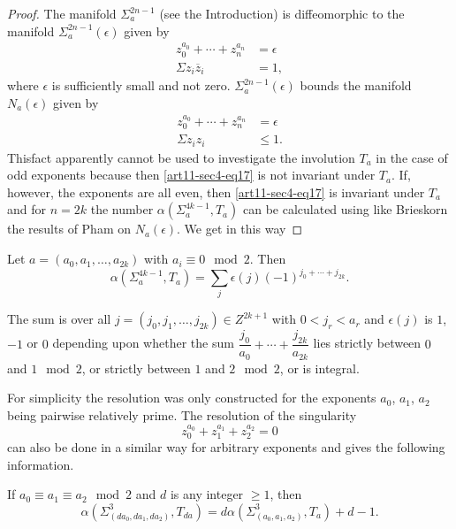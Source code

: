 \begin{proof}
The manifold $\Sigma^{2n-1}_{a}$ (see the Introduction) is diffeomorphic to the manifold $\Sigma^{2n-1}_{a}(\epsilon)$ given by
\begin{align*}
z^{a_{0}}_{0}+\cdots+z^{a_{n}}_{n} &=\epsilon\tag{16}\label{art11-sec4-eq16}\\
\Sigma z_{i}\overline{z}_{i} &= 1,
\end{align*}
where $\epsilon$ is sufficiently small and not zero. $\Sigma^{2n-1}_{a}(\epsilon)$ bounds the manifold $N_{a}(\epsilon)$ given by
\begin{align*}
z^{a_{0}}_{0}+\cdots+ z^{a_{n}}_{n} &=\epsilon\tag{17}\label{art11-sec4-eq17}\\
\Sigma z_{i}z_{i} &\leq 1.
\end{align*}
This\pageoriginale fact apparently cannot be used to investigate the involution $T_{a}$ in the case of odd exponents because then \eqref{art11-sec4-eq17} is not invariant under $T_{a}$. If, however, the exponents are all even, then \eqref{art11-sec4-eq17} is invariant under $T_{a}$ and for $n=2k$ the number $\alpha(\Sigma^{4k-1}_{a},T_{a})$ can be calculated using like Brieskorn \cite{art11-key1} the results of Pham on $N_{a}(\epsilon)$. We get in this way
\end{proof}

\begin{theorem*}
Let $a=(a_{0},a_{1},\ldots,a_{2k})$ with $a_{i}\equiv 0\mod 2$. Then
\begin{equation*}
\alpha (\Sigma^{4k-1}_{a},T_{a})=\sum\limits_{j}\epsilon (j)(-1)^{j_{0}+\cdots+j_{2k}}.\tag{18}\label{art11-sec4-eq18}
\end{equation*}
\end{theorem*}

The sum is over all $j=(j_{0},j_{1},\ldots,j_{2k})\in Z^{2k+1}$ with $0<j_{r}<a_{r}$ and $\epsilon(j)$ is $1$, $-1$ or $0$ depending upon whether the sum $\dfrac{j_{0}}{a_{0}}+\cdots+\dfrac{j_{2k}}{a_{2k}}$ lies strictly between $0$ and $1\mod 2$, or strictly between $1$ and $2\mod 2$, or is integral.

\begin{remark*}
For simplicity the resolution was only constructed for the exponents $a_{0}$, $a_{1}$, $a_{2}$ being pairwise relatively prime. The resolution of the singularity
$$
z^{a_{0}}_{0}+z^{a_{1}}_{1}+z^{a_{2}}_{2}=0
$$
can also be done in a similar way for arbitrary exponents and gives the following information.
\end{remark*}

\begin{theorem*}
If $a_{0}\equiv a_{1}\equiv a_{2}\mod 2$ and $d$ is any integer $\geq 1$, then
$$
\alpha(\Sigma^{3}_{(da_{0},da_{1},da_{2})},T_{da})=d\alpha(\Sigma^{3}_{(a_{0},a_{1},a_{2})},T_{a})+d-1.
$$
\end{theorem*}


